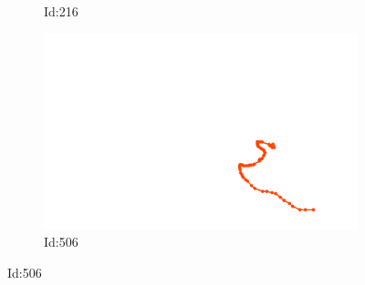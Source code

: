 \documentclass[12pt,twoside]{report}
\begin{document}
\begin{figure}
\begin{subfigure}[b]{0.20\textwidth}
\caption{Id:216}
\end{subfigure}
\begin{subfigure}[b]{0.20\textwidth}
\centering
\includegraphics[width=\textwidth]{../../trajectories/506.png}
\caption{Id:506}
\end{subfigure}
\end{figure}
\end{document}

